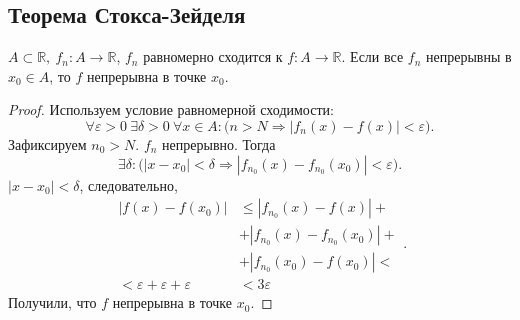 \documentclass[11pt]{book}
\newcommand{\R}{\mathbb{R}}
\renewcommand{\le}{\leqslant}
\theoremstyle{definition}
\theoremstyle{plain}
\theoremstyle{plain}
\theoremstyle{definition}
\theoremstyle{remark}
\begin{document}
\subsection{Теорема Стокса-Зейделя}
\begin{thm}
    $ A \subset \R, ~ f_n: A \to  \R$, $ f_n$ равномерно сходится к $ f: A \to \R$. Если все $ f_n$ непрерывны в  $ x_0 \in A$, то $ f$ непрерывна в точке $ x_0$.
\end{thm}
\begin{proof}
    Используем условие равномерной сходимости:
    \[
	\forall  \varepsilon >0 ~ \exists \delta>0 ~ \forall x \in A: \bigl( n > N \Longrightarrow |f_n(x) - f(x) | < \varepsilon \bigr)
    .\] 
    Зафиксируем $ n_0 > N$. $ f_n$ непрерывно.
    Тогда 
    \[
	\exists \delta: \bigl(|x-x_0| < \delta \Longrightarrow |f_{n_0}(x) - f_{n_0}(x_0)|< \varepsilon \bigr)
    .\] 
    $ |x-x_0| < \delta$, следовательно, 
    \[
	\begin{aligned}
	    |f(x) - f(x_0)| &\le |f_{n_0}(x) - f(x)| + \\
	    &+ | f_{n_0} (x)- f_{n_0}(x_0)| + \\
	    &+ |f_{n_0}(x_0) - f(x_0)| < \\
	    < \varepsilon + \varepsilon + \varepsilon &<  3 \varepsilon 
	\end{aligned}
    .\] 
    Получили, что $ f$ непрерывна в точке $ x_0$.
\end{proof}
\end{document}

